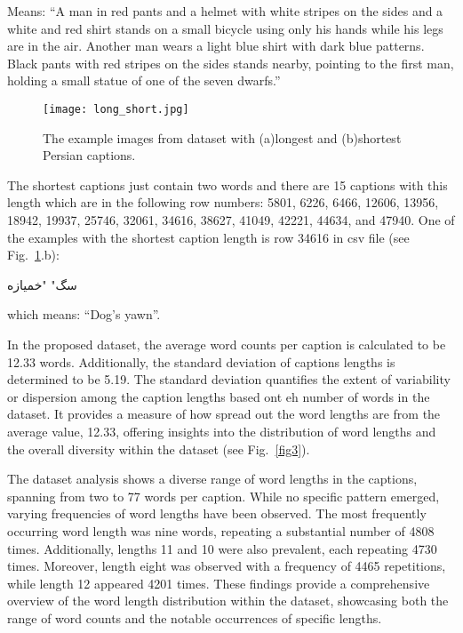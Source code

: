 \documentclass[runningheads]{llncs}
\begin{document}
Means: ``A man in red pants and a helmet with white stripes on the sides and a white and red shirt stands on a small bicycle using only his hands while his legs are in the air. Another man wears a light blue shirt with dark blue patterns. Black pants with red stripes on the sides stands nearby, pointing to the first man, holding a small statue of one of the seven dwarfs.''

\begin{figure}
  \begin{center}
    \texttt{[image: long\_short.jpg]}
    \caption{The example images from dataset with (a)longest and (b)shortest Persian captions.} \label{fig2}
  \end{center}
\end{figure}

The shortest captions just contain two words and there are 15 captions with this length which are in the following row numbers: 5801, 6226, 6466, 12606, 13956, 18942, 19937, 25746, 32061, 34616, 38627, 41049, 42221, 44634, and 47940. One of the examples with the shortest caption length is row 34616 in csv file (see Fig.~\ref{fig2}.b):\begin{farsi}
\arabicfont\small
سگ" "خمیازه\end{farsi}
which means: ``Dog's yawn''.

In the proposed dataset, the average word counts per caption is calculated to be 12.33 words. Additionally, the standard deviation of captions lengths is determined to be 5.19. The standard deviation quantifies the extent of variability or dispersion among the caption lengths based ont eh number of words in the dataset. It provides a measure of how spread out the word lengths are from the average value, 12.33, offering insights into the distribution of word lengths and the overall diversity within the dataset (see Fig.~\ref{fig3}).

The dataset analysis shows a diverse range of word lengths in the captions, spanning from two to 77 words per caption. While no specific pattern emerged, varying frequencies of word lengths have been observed. The most frequently occurring word length was nine words, repeating a substantial number of 4808 times. Additionally, lengths 11 and 10 were also prevalent, each repeating 4730 times. Moreover, length eight was observed with a frequency of 4465 repetitions, while length 12 appeared 4201 times. These findings provide a comprehensive overview of the word length distribution within the dataset, showcasing both the range of word counts and the notable occurrences of specific lengths.
\end{document}
